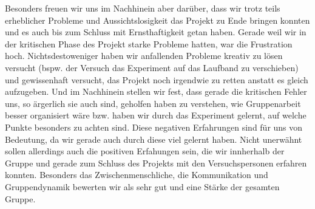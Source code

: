 \documentclass{Bericht}
\begin{document}
Besonders freuen wir uns im Nachhinein aber darüber, dass wir trotz teils erheblicher Probleme und Aussichtslosigkeit das Projekt zu Ende bringen konnten und es auch bis zum Schluss mit Ernsthaftigkeit getan haben. Gerade weil wir in der kritischen Phase des Projekt starke Probleme hatten, war die Frustration hoch. Nichtsdestoweniger haben wir anfallenden Probleme kreativ zu lösen versucht (bspw. der Versuch das Experiment auf das Laufband zu verschieben) und gewissenhaft versucht, das Projekt noch irgendwie zu retten anstatt es gleich aufzugeben. Und im Nachhinein stellen wir fest, dass gerade die kritischen Fehler uns, so ärgerlich sie auch sind, geholfen haben zu verstehen, wie Gruppenarbeit besser organisiert wäre bzw. haben wir durch das Experiment gelernt, auf welche Punkte besonders zu achten sind. Diese negativen Erfahrungen sind für uns von Bedeutung, da wir gerade auch durch diese viel gelernt haben.
Nicht unerwähnt sollen allerdings auch die positiven Erfahungen sein, die wir innherhalb der Gruppe und gerade zum Schluss des Projekts mit den Versuchspersonen erfahren konnten. Besonders das Zwischenmenschliche, die Kommunikation und Gruppendynamik bewerten wir als sehr gut und eine Stärke der gesamten Gruppe. 




\end{document}
